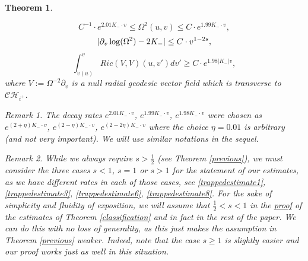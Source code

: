 \documentclass[10pt,a4paper]{article}
\theoremstyle{plain}
\newtheorem{thm}{Theorem}[section]
\theoremstyle{remark}
\newtheorem{rmk}{Remark}[section]
\theoremstyle{definition}
\theoremstyle{plain}
\theoremstyle{remark}
\theoremstyle{definition}
\newcommand{\CH}{\mathcal{CH}_{i^+}}
\numberwithin{equation}{section}
\begin{document}
\begin{thm}
\begin{enumerate}
\begin{equation}
		C^{-1} \cdot  e^{2.01 K_- \cdot  v}  \leq \Omega^2(u,v) \leq C \cdot  e^{1.99 K_- \cdot  v},	\end{equation} \begin{equation} \label{trappedestimate11} 
		|\partial_v \log(\Omega^2) -2K_-| \leq C \cdot \color{black}v^{1-2s},	\end{equation}
		\begin{equation} \label{trappedestimate10} 
		\int_{v(u)}^{v} Ric(V,V)(u,v')dv' \geq C \cdot  e^{1.98 |K_-| v} ,	\end{equation}
		where $V:= \Omega^{-2} \partial_v$ is a null radial geodesic vector field which is transverse to $\CH$. %
	\end{enumerate}
	\begin{rmk} \label{weirdrate}
The decay rates $e^{2.01 K_- \cdot  v}$, $e^{1.99 K_- \cdot  v}$, $e^{1.98 K_- \cdot  v}$ were chosen as $e^{(2+\eta) K_- \cdot  v}$, $e^{ (2-\eta) K_- \cdot  v}$, $e^{(2-2\eta) K_- \cdot  v}$ where the choice $\eta=0.01$ is arbitrary (and not very important). We will use similar notations in the sequel.
	\end{rmk} \color{black}
	\begin{rmk} \label{s<1remark}
		While we always require $s>\frac{1}{2}$ (see Theorem \ref{previous}), we must consider the three cases $s<1$, $s=1$ or $s>1$ for the statement of our estimates, as we have different rates in each of those cases, see \eqref{trappedestimate1}, \eqref{trappedestimate3}, \eqref{trappedestimate6}, \eqref{trappedestimate8}. For the sake of simplicity and fluidity of exposition, we will assume that $\frac{1}{2}<s<1$ in the \underline{proof} of the estimates of Theorem \ref{classification} and in fact in the rest of the paper. We can do this with no loss of generality, as this just makes the assumption in Theorem \ref{previous} \textit{weaker}. Indeed, note that the case $s \geq 1$ is slightly easier and our proof works just as well in this situation.
	\end{rmk}
	
\end{thm}
\end{document}
